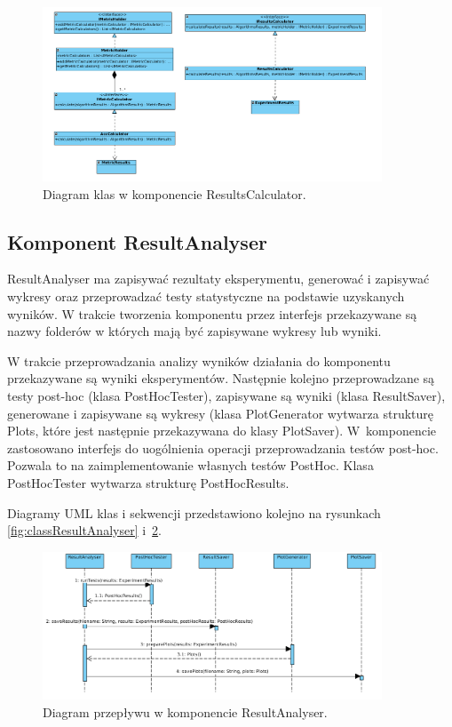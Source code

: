 \documentclass[12pt]{article}
\begin{document}
\begin{figure}[!h]
\centering
	\includegraphics[width=0.9\textwidth]{img/class_diagrams/results_calc.png}
	\caption{Diagram klas w komponencie ResultsCalculator.}
	\label{fig:classResultsCalculator}
\end{figure}

\subsection{Komponent ResultAnalyser}

ResultAnalyser ma zapisywać rezultaty eksperymentu, generować i zapisywać wykresy oraz przeprowadzać testy statystyczne na podstawie uzyskanych wyników. W trakcie tworzenia komponentu przez interfejs przekazywane są nazwy folderów w których mają być zapisywane wykresy lub wyniki. 

W trakcie przeprowadzania analizy wyników działania do komponentu przekazywane są wyniki eksperymentów. Następnie kolejno przeprowadzane są testy post-hoc (klasa PostHocTester), zapisywane są wyniki (klasa ResultSaver), generowane i zapisywane są wykresy (klasa PlotGenerator wytwarza strukturę Plots, które jest następnie przekazywana do klasy PlotSaver). W~komponencie zastosowano interfejs do uogólnienia operacji przeprowadzania testów post-hoc. Pozwala to na zaimplementowanie własnych testów PostHoc. Klasa PostHocTester wytwarza strukturę PostHocResults.


Diagramy UML klas i sekwencji przedstawiono kolejno na rysunkach \ref{fig:classResultAnalyser} i~\ref{fig:sequenceResultAnalyser}.

\begin{figure}[!h]
	\centering
	\includegraphics[width=0.9\textwidth]{img/sequenceResultAnalyser.png}
	\caption{Diagram przepływu w komponencie ResultAnalyser.}
	\label{fig:sequenceResultAnalyser}
\end{figure}
\end{document}
